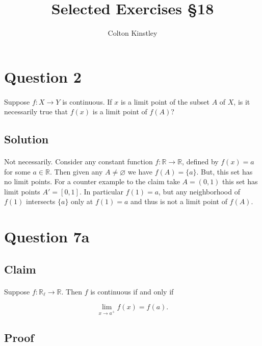 \documentclass[11pt, oneside]{article}   	%
\title{Selected Exercises \S18}
\author{Colton Kinstley}
\newcommand{\R}{\mathbb{R}}
\newcommand{\nullset}{\varnothing}
\newcommand{\set}[1]{\{ #1 \}}
\begin{document}
\maketitle

\section*{Question 2}
\paragraph{}
Suppose $f:X \rightarrow Y$ is continuous. If $x$ is a limit point of the subset $A$ of $X$, is it necessarily true that $f(x)$ is a limit point of $f(A)$?

\subsection*{Solution}
\paragraph{}

Not necessarily. Consider any constant function $f:\R \rightarrow \R$, defined by $f(x) = a$ for some $a 
\in \R$. Then given any $A \neq \nullset$ we have $f(A) = \{a\}$. But, this set has no limit points. For a counter example to the claim take $A = (0,1)$ this set has limit points $A' = [0,1]$. In particular $f(1) = a$, but any neighborhood of $f(1)$ intersects $\set{a}$ only at $f(1) = a$ and thus is not a limit point of $f(A)$.


\section*{Question 7a}
\subsection*{Claim}

\paragraph{}

Suppose $f:\R_\ell \rightarrow \R$. Then $f$ is continuous if and only if 

\begin{equation*}
\lim_{x \rightarrow a^+} f(x) = f(a).
\end{equation*}

\subsection*{Proof}
\end{document}
